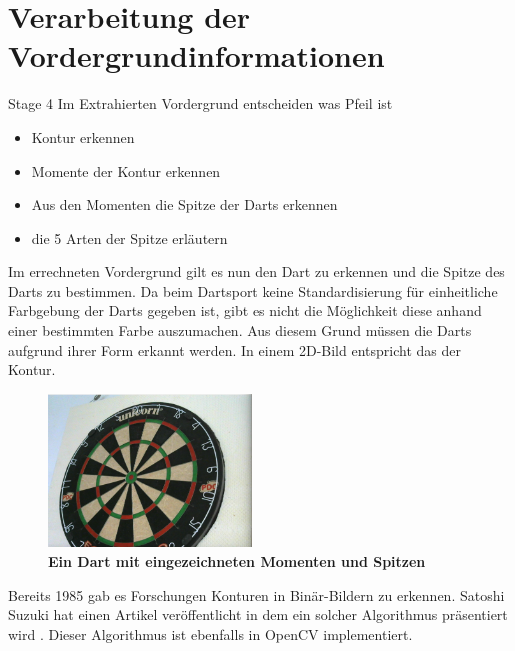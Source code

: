 \section{Verarbeitung der Vordergrundinformationen}
\label{sec:foreground}
Stage 4 Im Extrahierten Vordergrund entscheiden was Pfeil ist
\begin{itemize}
\item Kontur erkennen
\item Momente der Kontur erkennen
\item Aus den Momenten die Spitze der Darts erkennen
\item die 5 Arten der Spitze erläutern
\end{itemize}
Im errechneten Vordergrund gilt es nun den Dart zu erkennen und die Spitze des Darts zu bestimmen. Da beim Dartsport keine Standardisierung für einheitliche Farbgebung der Darts gegeben ist, gibt es nicht die Möglichkeit diese anhand einer bestimmten Farbe auszumachen. Aus diesem Grund müssen die Darts aufgrund ihrer Form erkannt werden. In einem 2D-Bild entspricht das der Kontur.
\begin{figure}[ht]
\centering
\includegraphics[width=0.48\textwidth]{media/undetected.png}
\caption{\textbf{Ein Dart mit eingezeichneten Momenten und Spitzen}}
\label{Fig:detecteddart}
\end{figure}
Bereits 1985 gab es Forschungen Konturen in Binär-Bildern zu erkennen. Satoshi Suzuki hat einen Artikel veröffentlicht in dem ein solcher Algorithmus präsentiert wird \autocite{contour1985}. Dieser Algorithmus ist ebenfalls in OpenCV implementiert. 

